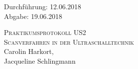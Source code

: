 

\begin{titlepage}
  \begin{flushleft}
 Durchführung: 12.06.2018\\
 Abgabe: 19.06.2018
  \end{flushleft}



 \begin{center}


\textsc{\LARGE Praktikumsprotokoll US2}\\[1.5cm]
\textsc{\huge Scanverfahren in der Ultraschalltechnik } \\[5,5cm]

Carolin Harkort\footnotemark[1], \\
Jacqueline Schlingmann\footnotemark[2] \\[1,0cm]



 \end{center}

 \vfill

\end{titlepage}


  
  

\nocite{*}
\printbibliography

